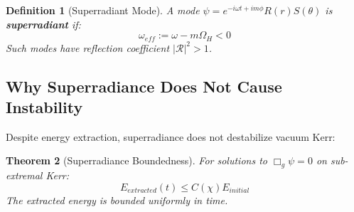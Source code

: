 \documentclass[12pt,a4paper]{article}
\newtheorem{theorem}{Theorem}[section]
\newtheorem{definition}[theorem]{Definition}
\begin{document}
\begin{definition}[Superradiant Mode]
A mode $\psi = e^{-i\omega t + im\phi}R(r)S(\theta)$ is \textbf{superradiant} if:
\begin{equation}
\omega_{eff} := \omega - m\Omega_H < 0
\end{equation}
Such modes have reflection coefficient $|\mathcal{R}|^2 > 1$.
\end{definition}

\subsection{Why Superradiance Does Not Cause Instability}

Despite energy extraction, superradiance does not destabilize vacuum Kerr:

\begin{theorem}[Superradiance Boundedness]\label{thm:superradiance}
For solutions to $\Box_g \psi = 0$ on sub-extremal Kerr:
\begin{equation}
E_{extracted}(t) \leq C(\chi) E_{initial}
\end{equation}
The extracted energy is bounded uniformly in time.
\end{theorem}
\end{document}
